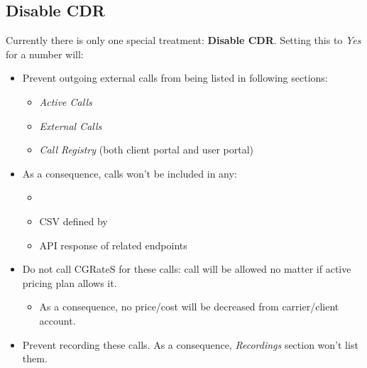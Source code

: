 \documentclass[letterpaper,10pt,spanish]{sphinxmanual}
\begin{document}
\subsection{Disable CDR}
\label{administration_portal/platform/global_special_numbers:disable-cdr}
Currently there is only one special treatment: \textbf{Disable CDR}. Setting this to \emph{Yes} for a number will:
\begin{itemize}
\item {} 
Prevent outgoing external calls from being listed in following sections:
\begin{itemize}
\item {} 
\emph{Active Calls}

\item {} 
\emph{External Calls}

\item {} 
\emph{Call Registry} (both client portal and user portal)

\end{itemize}

\item {} 
As a consequence, calls won't be included in any:
\begin{itemize}
\item {} 
{\hyperref[administration_portal/brand/invoicing/invoices:invoices]{}}

\item {} 
CSV defined by {\hyperref[administration_portal/client/wholesale/calls/call_csv_schedulers:call\string-csv\string-schedulers]{}}

\item {} 
API response of related endpoints

\end{itemize}

\item {} 
Do not call CGRateS for these calls: call will be allowed no matter if active pricing plan allows it.
\begin{itemize}
\item {} 
As a consequence, no price/cost will be decreased from carrier/client account.

\end{itemize}

\item {} 
Prevent recording these calls. As a consequence, \emph{Recordings} section won't list them.

\end{itemize}
\end{document}
